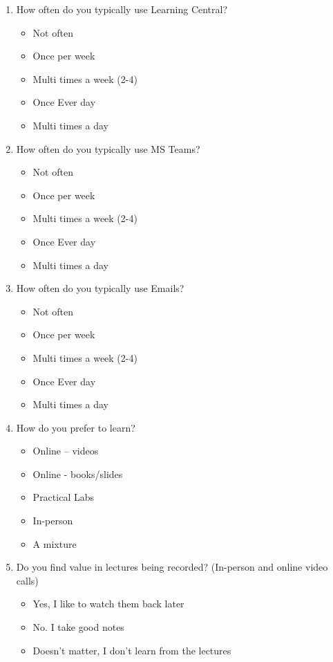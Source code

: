 \begin{enumerate}
    \item How often do you typically use Learning Central?
    \begin{itemize}
        \item Not often
        \item Once per week
        \item Multi times a week (2-4)
        \item Once Ever day
        \item Multi times a day
    \end{itemize}
    
    \item How often do you typically use MS Teams?
    \begin{itemize}
        \item Not often
        \item Once per week
        \item Multi times a week (2-4)
        \item Once Ever day
        \item Multi times a day 
    \end{itemize}
    
    \item How often do you typically use Emails?
    \begin{itemize}
        \item Not often
        \item Once per week
        \item Multi times a week (2-4)
        \item Once Ever day
        \item Multi times a day 
    \end{itemize}
    
    \item How do you prefer to learn?
    \begin{itemize}
        \item Online – videos
        \item Online - books/slides
        \item Practical Labs
        \item In-person
        \item A mixture 
    \end{itemize}
    
    \item Do you find value in lectures being recorded? (In-person and online video calls)
    \begin{itemize}
        \item Yes, I like to watch them back later
        \item No. I take good notes
        \item Doesn't matter, I don't learn from the lectures
    \end{itemize}
    

\end{enumerate}
